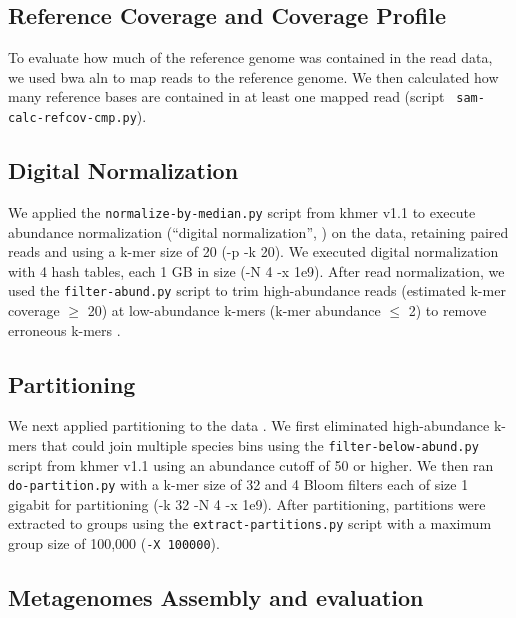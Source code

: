\subsection*{Reference Coverage and Coverage Profile} 

To evaluate how much of the reference genome was contained in the read
data, we used bwa aln to map reads to the reference genome.
We then calculated how many
reference bases are contained in at least one mapped read (script {\tt
sam-calc-refcov-cmp.py}). 

\subsection*{Digital Normalization} 

We applied the {\tt normalize-by-median.py} script from khmer v1.1 to
execute abundance normalization (``digital normalization'', \cite{brown2012})  on the data, retaining paired reads and using a
k-mer size of 20 (-p -k 20).  We executed digital normalization with 4
hash tables, each 1 GB in size (-N 4 -x 1e9).  After read
normalization, we used the {\tt filter-abund.py} script to trim
high-abundance reads (estimated k-mer coverage $\geq$ 20) at low-abundance
k-mers (k-mer abundance $\leq$ 2)   %
to remove erroneous k-mers  \cite{qingpeng2014} \cite{streaming}. 


\subsection*{Partitioning} 

We next applied partitioning to the data \cite{jpell2012, ahowe2014}.
We first eliminated high-abundance k-mers that could join multiple
species bins using the {\tt filter-below-abund.py} script from khmer v1.1 using an abundance cutoff of 50 or higher.
We then ran {\tt do-partition.py} with a k-mer size of 32 and 4 Bloom
filters each of size 1 gigabit for partitioning (-k 32 -N 4 -x 1e9).  After
partitioning, partitions were extracted to groups using the {\tt extract-partitions.py} script with a maximum group size of 100,000 ({\tt -X 100000}).

\subsection*{Metagenomes Assembly and evaluation}

